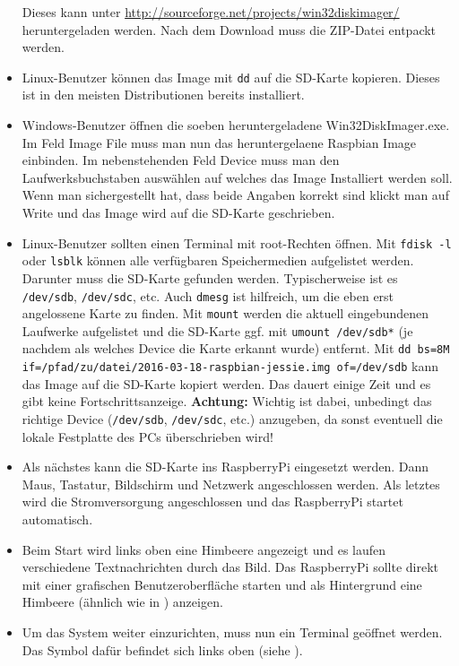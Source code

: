 \begin{itemize}
{		Dieses kann unter \url{http://sourceforge.net/projects/win32diskimager/} heruntergeladen werden. 
		Nach dem Download muss die ZIP-Datei entpackt werden.
		}
	\item {Linux-Benutzer können das Image mit \lstinline|dd| auf die SD-Karte kopieren. Dieses ist in den meisten Distributionen bereits installiert.
		}
	\item {Windows-Benutzer öffnen die soeben heruntergeladene Win32DiskImager.exe. Im Feld Image File muss man nun das heruntergelaene Raspbian Image einbinden. 
		Im nebenstehenden Feld Device muss man den Laufwerksbuchstaben auswählen auf welches das Image Installiert werden soll. 
		Wenn man sichergestellt hat, dass beide Angaben korrekt sind klickt man auf Write und das Image wird auf die SD-Karte geschrieben.
		}
	\item {Linux-Benutzer sollten einen Terminal mit root-Rechten öffnen. 
		Mit \lstinline|fdisk -l| oder \lstinline|lsblk| können alle verfügbaren Speichermedien aufgelistet werden. Darunter muss die SD-Karte gefunden werden.
		Typischerweise ist es \lstinline|/dev/sdb|, \lstinline|/dev/sdc|, etc.
		Auch \lstinline|dmesg| ist hilfreich, um die eben erst angelossene Karte zu finden. 
		Mit \lstinline|mount| werden die aktuell eingebundenen Laufwerke aufgelistet und 
		die SD-Karte ggf. mit \lstinline|umount /dev/sdb*| (je nachdem als welches Device die Karte erkannt wurde) entfernt.
		Mit \lstinline|dd bs=8M if=/pfad/zu/datei/2016-03-18-raspbian-jessie.img of=/dev/sdb| kann das Image auf die SD-Karte kopiert werden.
		Das dauert einige Zeit und es gibt keine Fortschrittsanzeige.
		\textbf{Achtung:} Wichtig ist dabei, unbedingt das richtige Device (\lstinline|/dev/sdb|, \lstinline|/dev/sdc|, etc.) anzugeben, 
		da sonst eventuell die lokale Festplatte des PCs überschrieben wird!
		}
	\item {Als nächstes kann die SD-Karte ins RaspberryPi eingesetzt werden. Dann Maus, Tastatur, Bildschirm und Netzwerk angeschlossen werden. 
		Als letztes wird die Stromversorgung angeschlossen und das RaspberryPi startet automatisch.
		}
	\item {Beim Start wird links oben eine Himbeere angezeigt und es laufen verschiedene Textnachrichten durch das Bild. 
		Das RaspberryPi sollte direkt mit einer grafischen Benutzeroberfläche starten und als Hintergrund eine Himbeere (ähnlich wie in ) anzeigen.
		}
	\item {Um das System weiter einzurichten, muss nun ein Terminal geöffnet werden.
		Das Symbol dafür befindet sich links oben (siehe ).
}
\end{itemize}
